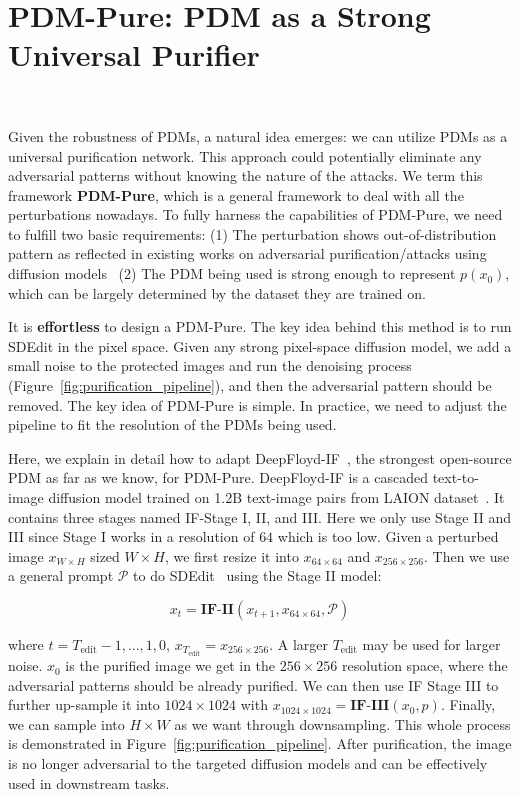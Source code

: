 \documentclass{article}
\begin{document}
\section{PDM-Pure: PDM as a Strong  Universal Purifier}~\label{sec:pdm_pure}
\vspace{-0.4cm}

Given the robustness of PDMs, a natural idea emerges: we can utilize PDMs as a universal purification network. This approach could potentially eliminate any adversarial patterns without knowing the nature of the attacks. We term this framework \textbf{PDM-Pure}, which is a general framework to deal with all the perturbations nowadays. To fully harness the capabilities of PDM-Pure, we need to fulfill two basic requirements: (1) The perturbation shows out-of-distribution pattern as reflected in existing works on adversarial purification/attacks using diffusion models~\cite{nie2022diffusion,diff-pgd} (2) The PDM being used is strong enough to represent $p(x_0)$, which can be largely determined by the dataset they are trained on. 

It is \textbf{effortless} to design a PDM-Pure. The key idea behind this method is to run SDEdit in the pixel space. Given any strong pixel-space diffusion model, we add a small noise to the protected images and run the denoising process (Figure~\ref{fig:purification_pipeline}), and then the adversarial pattern should be removed. The key idea of PDM-Pure is simple. In practice, we need to adjust the pipeline to fit the resolution of the PDMs being used. 

Here, we explain in detail how to adapt DeepFloyd-IF~\cite{deepfloyd}, the strongest open-source PDM as far as we know, for PDM-Pure. DeepFloyd-IF is a cascaded text-to-image diffusion model trained on 1.2B text-image pairs from LAION dataset~\cite{schuhmann2022laion}. It contains three stages named IF-Stage I, II, and III. Here we only use Stage II and III since Stage I works in a resolution of $64$ which is too low. Given a perturbed image $x_{W\times H}$ sized $W\times H$, we first resize it into $x_{64\times 64}$ and $x_{256\times 256}$. Then we use a general prompt  $\mathcal{P}$ to do SDEdit~\cite{meng2021sdedit} using the Stage II model: 

\begin{equation}
    x_t = \textbf{IF-II}(x_{t+1}, x_{64\times 64}, \mathcal{P})
\end{equation}

where $t=T_{\text{edit}}-1, ...,1, 0$, $x_{T_{\text{edit}}}=x_{256\times 256}$. A larger $T_{\text{edit}}$ may be used for larger noise. $x_0$ is the purified image we get in the $256\times 256$ resolution space, where the adversarial patterns should be already purified. We can then use IF Stage III to further up-sample it into $1024\times 1024$ with $x_{1024\times 1024} = \textbf{IF-III}(x_0, p)$. Finally, we can sample into $H\times W$ as we want through downsampling. This whole process is demonstrated in Figure~\ref{fig:purification_pipeline}. After purification, the image is no longer adversarial to the targeted diffusion models and can be effectively used in downstream tasks.
\end{document}
